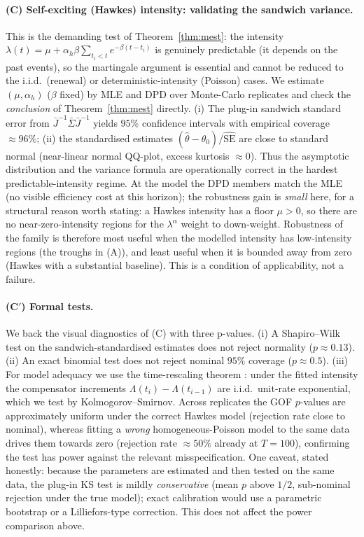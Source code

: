 \documentclass[smallextended,natbib]{svjour3}
\begin{document}
\paragraph{(C) Self-exciting (Hawkes) intensity: validating the sandwich variance.}
This is the demanding test of Theorem~\ref{thm:mest}: the intensity
$\lambda(t)=\mu+\alpha_h\beta\sum_{t_i<t}e^{-\beta(t-t_i)}$ is genuinely
predictable (it depends on the past events), so the martingale argument is
essential and cannot be reduced to the i.i.d.\ (renewal) or deterministic-intensity
(Poisson) cases. We estimate $(\mu,\alpha_h)$ ($\beta$ fixed) by MLE and DPD over
Monte-Carlo replicates and check the \emph{conclusion} of Theorem~\ref{thm:mest}
directly. (i) The plug-in sandwich standard error from $\bar J^{-1}\bar\Sigma\bar
J^{-1}$ yields $95\%$ confidence intervals with empirical coverage $\approx96\%$;
(ii) the standardised estimates $(\hat\theta-\theta_0)/\widehat{\mathrm{SE}}$ are
close to standard normal (near-linear normal QQ-plot, excess kurtosis $\approx0$).
Thus the asymptotic distribution and the variance formula are operationally
correct in the hardest predictable-intensity regime. At the model the DPD members
match the MLE (no visible efficiency cost at this horizon); the robustness gain is
\emph{small} here, for a structural reason worth stating: a Hawkes intensity has a
floor $\mu>0$, so there are no near-zero-intensity regions for the $\lambda^{\alpha}$
weight to down-weight. Robustness of the family is therefore most useful when the
modelled intensity has low-intensity regions (the troughs in (A)), and least useful
when it is bounded away from zero (Hawkes with a substantial baseline). This is a
condition of applicability, not a failure.

\paragraph{(C$'$) Formal tests.}
We back the visual diagnostics of (C) with three p-values. (i) A Shapiro--Wilk
test on the sandwich-standardised estimates does not reject normality
($p\approx0.13$). (ii) An exact binomial test does not reject nominal $95\%$
coverage ($p\approx0.5$). (iii) For model adequacy we use the time-rescaling
theorem \citep{ogata1988,abgk1993}: under the fitted intensity the compensator
increments $\Lambda(t_i)-\Lambda(t_{i-1})$ are i.i.d.\ unit-rate exponential, which
we test by Kolmogorov--Smirnov. Across replicates the GOF $p$-values are
approximately uniform under the correct Hawkes model (rejection rate close to
nominal), whereas fitting a \emph{wrong} homogeneous-Poisson model to the same data
drives them towards zero (rejection rate $\approx50\%$ already at $T=100$),
confirming the test has power against the relevant misspecification. One caveat,
stated honestly: because the parameters are estimated and then tested on the same
data, the plug-in KS test is mildly \emph{conservative} (mean $p$ above $1/2$, sub-nominal
rejection under the true model); exact calibration would use a parametric bootstrap
or a Lilliefors-type correction. This does not affect the power comparison above.
\end{document}
